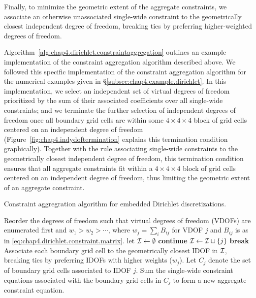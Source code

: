 Finally, to minimize the geometric extent of the aggregate constraints, we associate an otherwise unassociated single-wide constraint to the geometrically closest independent degree of freedom, breaking ties by preferring higher-weighted degrees of freedom.

Algorithm~\ref{alg:chap4.dirichlet.constraintaggregation} outlines an example implementation of the constraint aggregation algorithm described above. We followed this specific implementation of the constraint aggregation algorithm for the numerical examples given in \S\ref{subsec:chap4.example.dirichlet}. In this implementation, we select an independent set of virtual degrees of freedom prioritized by the sum of their associated coefficients over all single-wide constraints; and we terminate the further selection of independent degrees of freedom once all boundary grid cells are within some $4 \times 4 \times 4$ block of grid cells centered on an independent degree of freedom (Figure~\ref{fig:chap4.indydoftermination} explains this termination condition graphically). Together with the rule associating single-wide constraints to the geometrically closest independent degree of freedom, this termination condition ensures that all aggregate constraints fit within a $4 \times 4 \times 4$ block of grid cells centered on an independent degree of freedom, thus limiting the geometric extent of an aggregate constraint.

\begin{algorithm}[htbp]
\caption{Constraint aggregration algorithm for embedded Dirichlet discretizations.}
\label{alg:chap4.dirichlet.constraintaggregation}
\begin{algorithmic}[1]
\STATE Reorder the degrees of freedom such that virtual degrees of freedom (VDOFs) are enumerated first and $w_1 > w_2 > \dotsm$, where $w_j = \sum_i B_{ij}$ for VDOF $j$ and $B_{ij}$ is as in \eqref{eq:chap4.dirichlet.constraint.matrix}.
\STATE let $\mathcal{I} \leftarrow \emptyset$ 
\STATE {}
    \STATE {}
        \STATE \textbf{continue}
    \ENDIF
    \STATE $\mathcal{I} \leftarrow \mathcal{I} \sqcup \left\lbrace j \right\rbrace$ 
    \STATE {}
        \STATE \textbf{break}
    \ENDIF
\ENDFOR
\STATE Associate each boundary grid cell to the geometrically closest IDOF in $\mathcal{I}$, breaking ties by preferring IDOFs with higher weights ($w_j$). Let $C_j$ denote the set of boundary grid cells associated to IDOF $j$.
    \STATE Sum the single-wide constraint equations associated with the boundary grid cells in $C_j$ to form a new aggregate constraint equation.
\ENDFOR
\end{algorithmic}
\end{algorithm}

